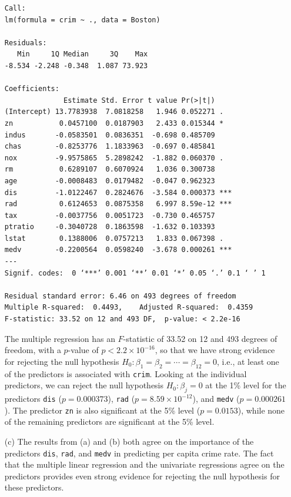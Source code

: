 \begin{itemize}
\begin{lstlisting}
Call:
lm(formula = crim ~ ., data = Boston)

Residuals:
   Min     1Q Median     3Q    Max
-8.534 -2.248 -0.348  1.087 73.923

Coefficients:
              Estimate Std. Error t value Pr(>|t|)
(Intercept) 13.7783938  7.0818258   1.946 0.052271 .
zn           0.0457100  0.0187903   2.433 0.015344 *
indus       -0.0583501  0.0836351  -0.698 0.485709
chas        -0.8253776  1.1833963  -0.697 0.485841
nox         -9.9575865  5.2898242  -1.882 0.060370 .
rm           0.6289107  0.6070924   1.036 0.300738
age         -0.0008483  0.0179482  -0.047 0.962323
dis         -1.0122467  0.2824676  -3.584 0.000373 ***
rad          0.6124653  0.0875358   6.997 8.59e-12 ***
tax         -0.0037756  0.0051723  -0.730 0.465757
ptratio     -0.3040728  0.1863598  -1.632 0.103393
lstat        0.1388006  0.0757213   1.833 0.067398 .
medv        -0.2200564  0.0598240  -3.678 0.000261 ***
---
Signif. codes:  0 ‘***’ 0.001 ‘**’ 0.01 ‘*’ 0.05 ‘.’ 0.1 ‘ ’ 1

Residual standard error: 6.46 on 493 degrees of freedom
Multiple R-squared:  0.4493,    Adjusted R-squared:  0.4359
F-statistic: 33.52 on 12 and 493 DF,  p-value: < 2.2e-16
        \end{lstlisting}
        The multiple regression has an $F$-statistic of 33.52 on 12 and 493
        degrees of freedom, with a $p$-value of $p < 2.2 \times {10}^{-16}$, so
        that we have strong evidence for rejecting the null hypothesis
        $H_0 : \beta_1 = \beta_2 = \cdots = \beta_{12} = 0$, i.e., at least one
        of the predictors is associated with \verb|crim|. Looking at the
        individual predictors, we can reject the null hypothesis
        $H_0 : \beta_j = 0$ at the 1\% level for the predictors \verb|dis|
        ($p = 0.000373$), \verb|rad| ($p = 8.59 \times {10}^{-12}$), and
        \verb|medv| ($p = 0.000261$). The predictor \verb|zn| is also
        significant at the 5\% level ($p = 0.0153$), while none of the remaining
        predictors are significant at the 5\% level.
    \item[(c)] The results from (a) and (b) both agree on the importance of the
        predictors \verb|dis|, \verb|rad|, and \verb|medv| in predicting per
        capita crime rate. The fact that the multiple linear regression and the
        univariate regressions agree on the predictors provides even strong
        evidence for rejecting the null hypothesis for these predictors.


\end{itemize}
